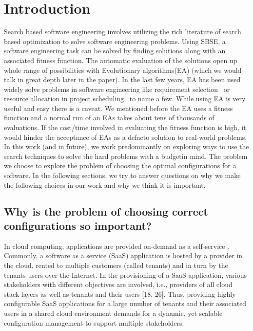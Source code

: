 \documentclass{newsig}
\begin{document}
\section{Introduction}
Search based software engineering involves utilizing the rich literature of search based optimization to solve software engineering problems. Using SBSE, a software engineering task can be solved by finding solutions along with an associated fitness function. 
The automatic evaluation of the solutions open up whole range of possibilities with Evolutionary algorithms(EA) (which we would talk in great depth later in the paper). In the last few years, EA has been used widely solve problems in software engineering like requirement selection~\cite{durillo2011study}  or resource allocation in project scheduling~\cite{luna2014software} to name a few. While using EA is very useful and easy there is a caveat. 
We mentioned before the EA uses a fitness function and a normal run of an EAs takes about tens of thousands of evaluations. If the cost/time involved in evaluating the fitness function is high, it would hinder the acceptance of EAs as a defacto solution to real-world problems. 
In this work (and in future), we work predominantly on exploring ways to use the search techniques to solve the hard problems with a \textquotesingle budget\textquotesingle  in mind. The problem we choose to explore the problem of choosing the optimal configurations for a software. In the following sections, we try to answer questions on why we make the following choices in our work and why we think it is important. 

\subsection*{Why is the problem of choosing correct configurations so important?}\label{section:importance}
In cloud computing, applications are provided on-demand
as a self-service \cite{bennett2000service}. Commonly, a software as a service
(SaaS) application is hosted by a provider in the cloud,
rented to multiple customers (called tenants) and  in turn by the tenants\textquotesingle 
users over the Internet. In the provisioning
of a SaaS application, various stakeholders with different
objectives are involved, i.e., providers of all cloud stack layers
as well as tenants and their users [18, 26]. Thus, providing
highly configurable SaaS applications for a large number
of tenants and their associated users in a shared cloud environment
demands for a dynamic, yet scalable configuration
management to support multiple stakeholders.  
\end{document}

